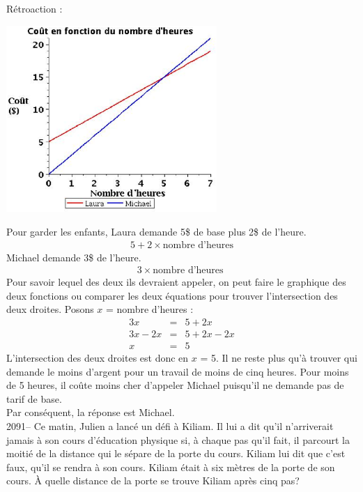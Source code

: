 \documentclass[letterpaper, 12pt]{article}
\begin{document}
R\'etroaction :\\
\begin{center}
 \includegraphics[width=8cm,bb=14 14 465 415]{Q2078.eps}
\end{center}
Pour garder les enfants, Laura demande 5\$ de base plus 2\$ de l'heure.
\begin{eqnarray*}
 5+2\times \textrm{nombre d'heures}
\end{eqnarray*}
Michael demande 3\$ de l'heure.
\begin{eqnarray*}
 3\times \textrm{nombre d'heures }
\end{eqnarray*}
Pour savoir lequel des deux ils devraient appeler, on peut faire le graphique des deux fonctions ou comparer les deux \'equations pour trouver l'intersection des deux droites. Posons $x$ = nombre d'heures :
\begin{eqnarray*}
 3x &=&  5 + 2x \\
3x - 2x &=& 5 + 2x -2x \\
 x &=& 5
\end{eqnarray*}
L'intersection des deux droites est donc en $x$ = 5. Il ne reste plus qu'\`a trouver qui demande le moins d'argent pour un travail de moins de cinq heures. Pour moins de 5 heures, il co\^ute moins cher d'appeler Michael puisqu'il ne demande pas de tarif de base.\\
Par cons\'equent, la r\'eponse est Michael.\\

2091-- Ce matin, Julien a lanc\'e un d\'efi \`a Kiliam. Il lui a dit qu'il n'arriverait jamais \`a son cours d'\'education physique si, \`a chaque pas qu'il fait, il parcourt la moiti\'e de la distance qui le s\'epare de la porte du cours. Kiliam lui dit que c'est faux, qu'il se rendra \`a son cours. Kiliam \'etait \`a six m\`etres de la porte de son cours. \`A quelle distance de la porte se trouve Kiliam apr\`es cinq pas?  \\
\end{document}
